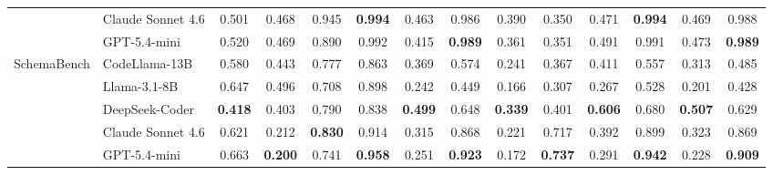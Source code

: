 \begin{table}[t]
{\begin{tabular}{llcccccccccccc}
 & Claude Sonnet 4.6 & 0.501 & 0.468 & 0.945 & \textbf{0.994} & 0.463 & 0.986 & 0.390 & 0.350 & 0.471 & \textbf{0.994} & 0.469 & 0.988 \\
 & GPT-5.4-mini & 0.520 & 0.469 & 0.890 & 0.992 & 0.415 & \textbf{0.989} & 0.361 & 0.351 & 0.491 & 0.991 & 0.473 & \textbf{0.989} \\
\midrule
\multirow{5}{*}{SchemaBench} & CodeLlama-13B & 0.580 & 0.443 & 0.777 & 0.863 & 0.369 & 0.574 & 0.241 & 0.367 & 0.411 & 0.557 & 0.313 & 0.485 \\
 & Llama-3.1-8B & 0.647 & 0.496 & 0.708 & 0.898 & 0.242 & 0.449 & 0.166 & 0.307 & 0.267 & 0.528 & 0.201 & 0.428 \\
 & DeepSeek-Coder & \textbf{0.418} & 0.403 & 0.790 & 0.838 & \textbf{0.499} & 0.648 & \textbf{0.339} & 0.401 & \textbf{0.606} & 0.680 & \textbf{0.507} & 0.629 \\
 & Claude Sonnet 4.6 & 0.621 & 0.212 & \textbf{0.830} & 0.914 & 0.315 & 0.868 & 0.221 & 0.717 & 0.392 & 0.899 & 0.323 & 0.869 \\
 & GPT-5.4-mini & 0.663 & \textbf{0.200} & 0.741 & \textbf{0.958} & 0.251 & \textbf{0.923} & 0.172 & \textbf{0.737} & 0.291 & \textbf{0.942} & 0.228 & \textbf{0.909} \\
\bottomrule
\end{tabular}%
}
\end{table}

